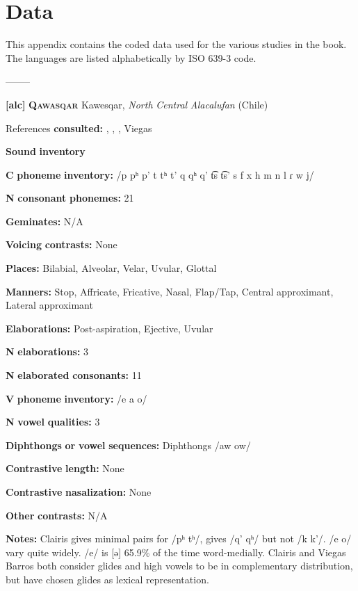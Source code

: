 
\chapter{Data}
This appendix contains the coded data used for the various studies in the book. The languages are listed alphabetically by ISO 639-3 code.

--------

\textbf{[alc]}   \textbf{\textsc{Qawasqar}}  Kawesqar, \textit{North} \textit{Central} \textit{Alacalufan} (Chile)

References \textbf{consulted:} \citet{Aguilera2001}, \citet{Clairis1977}, \citet{Clairis1985}, Viegas \citet{Barros1990}

\textbf{Sound} \textbf{inventory}

\textbf{C} \textbf{phoneme} \textbf{inventory:} /p pʰ p’ t tʰ t’ q qʰ q’ t͡s t͡s’ s f x h m n l ɾ w j/

\textbf{N} \textbf{consonant} \textbf{phonemes:} 21

\textbf{Geminates:} N/A

\textbf{Voicing} \textbf{contrasts:} None

\textbf{Places:} Bilabial, Alveolar, Velar, Uvular, Glottal

\textbf{Manners:} Stop, Affricate, Fricative, Nasal, Flap/Tap, Central approximant, Lateral approximant

\textbf{Elaborations:} Post-aspiration, Ejective, Uvular

\textbf{N} \textbf{elaborations:} 3

\textbf{N} \textbf{elaborated} \textbf{consonants:} 11

\textbf{V} \textbf{phoneme} \textbf{inventory:} /e a o/

\textbf{N} \textbf{vowel} \textbf{qualities:} 3

\textbf{Diphthongs} \textbf{or} \textbf{vowel} \textbf{sequences:} Diphthongs /aw ow/

\textbf{Contrastive} \textbf{length:} None

\textbf{Contrastive} \textbf{nasalization:} None

\textbf{Other} \textbf{contrasts:} N/A

\textbf{Notes:} Clairis gives minimal pairs for /pʰ tʰ/, gives /q’ qʰ/ but not /k k’/. /e o/ vary quite widely. /e/ is [ə] 65.9\% of the time word-medially. Clairis and Viegas Barros both consider glides and high vowels to be in complementary distribution, but have chosen glides as lexical representation.

